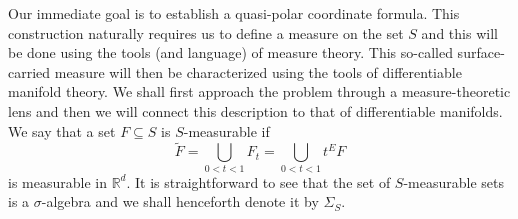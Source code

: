 \documentclass{article}
\theoremstyle{theorem}
\newtheorem{proposition}[theorem]{Proposition}
\theoremstyle{remark}
\newcommand\tr{\operatorname{tr}}
\begin{document}
\noindent Our immediate goal is to establish a quasi-polar coordinate formula. This construction naturally requires us to define a measure on the set $S$ and this will be done using the tools (and language) of measure theory. This so-called surface-carried measure will then be characterized using the tools of differentiable manifold theory. We shall first approach the problem through a measure-theoretic lens and then we will connect this description to that of differentiable manifolds.\\

\noindent We say that a set $F\subseteq S$ is $S$-measurable if 
\begin{equation*}
\tilde{F}=\bigcup_{0<t<1}F_t=\bigcup_{0<t<1} t^E F
\end{equation*}
is measurable in $\mathbb{R}^d$. It is straightforward to see that the set of $S$-measurable sets is a $\sigma$-algebra and we shall henceforth denote it by $\Sigma_S$.

%
%





\end{document}
